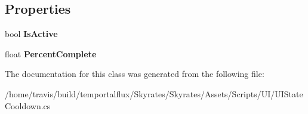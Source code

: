 \subsection*{Properties}
\begin{DoxyCompactItemize}
\item 
\hypertarget{class_skyrates_1_1_u_i_1_1_u_i_state_cooldown_3_01_t_01_4_a0f226b11a0d06fd31a3c96af82f1d86a}{bool {\bfseries Is\-Active}}\label{class_skyrates_1_1_u_i_1_1_u_i_state_cooldown_3_01_t_01_4_a0f226b11a0d06fd31a3c96af82f1d86a}

\item 
\hypertarget{class_skyrates_1_1_u_i_1_1_u_i_state_cooldown_3_01_t_01_4_af4631eae3b7081e4e342285455e2053d}{float {\bfseries Percent\-Complete}}\label{class_skyrates_1_1_u_i_1_1_u_i_state_cooldown_3_01_t_01_4_af4631eae3b7081e4e342285455e2053d}

\end{DoxyCompactItemize}


The documentation for this class was generated from the following file\-:\begin{DoxyCompactItemize}
\item 
/home/travis/build/temportalflux/\-Skyrates/\-Skyrates/\-Assets/\-Scripts/\-U\-I/U\-I\-State\-Cooldown.\-cs\end{DoxyCompactItemize}
